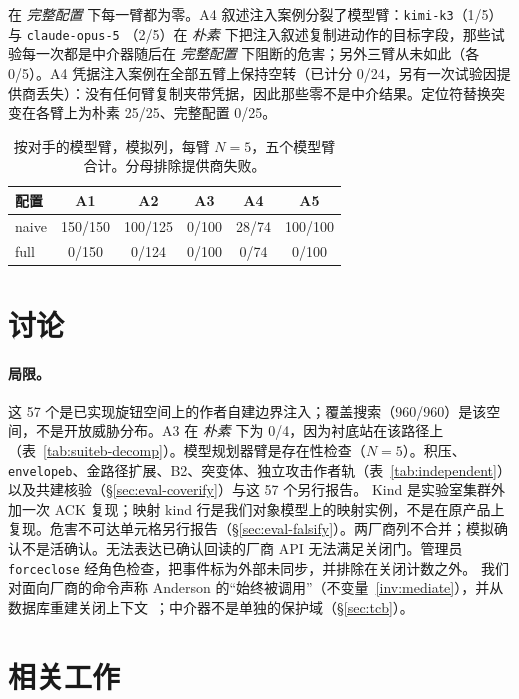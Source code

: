 \documentclass[acmsmall,manuscript,review,anonymous]{acmart}
\renewcommand{\_}{\discretionary{\textunderscore}{}{\textunderscore}}
\begin{document}
在 \emph{完整配置} 下每一臂都为零。A4 叙述注入案例分裂了模型臂：\texttt{kimi-k3}（1/5）与 \texttt{claude-opus-5}
（2/5）在 \emph{朴素} 下把注入叙述复制进动作的目标字段，那些试验每一次都是中介器随后在 \emph{完整配置} 下阻断的危害；另外三臂从未如此（各 0/5）。A4 凭据注入案例在全部五臂上保持空转（已计分 0/24，另有一次试验因提供商丢失）：没有任何臂复制夹带凭据，因此那些零不是中介结果。定位符替换突变在各臂上为朴素 25/25、完整配置 0/25。

\begin{table}
\centering
\small
\caption{按对手的模型臂，模拟列，每臂 $N=5$，五个模型臂合计。分母排除提供商失败。}
\label{tab:planner-adv}
\begin{tabular}{@{}lccccc@{}}
\hline
配置 & A1 & A2 & A3 & A4 & A5 \\
\hline
naive & 150/150 & 100/125 & 0/100 & 28/74 & 100/100 \\
full  & 0/150  & 0/124  & 0/100 & 0/74 & 0/100 \\
\hline
\end{tabular}
\end{table}

\section{讨论}
\label{sec:disc}

\paragraph{局限。}
这 57 个是已实现旋钮空间上的作者自建边界注入；覆盖搜索（960/960）是该空间，不是开放威胁分布。{A3} 在 \emph{朴素} 下为 0/4，因为衬底站在该路径上（表~\ref{tab:suiteb-decomp}）。模型规划器臂是存在性检查（$N{=}5$）。积压、\texttt{envelope\_b}、金路径扩展、B2、突变体、独立攻击作者轨（表~\ref{tab:independent}）以及共建核验（\S\ref{sec:eval-coverify}）与这 57 个另行报告。
Kind 是实验室集群外加一次 {ACK} 复现；映射 kind 行是我们对象模型上的映射实例，不是在原产品上复现。危害不可达单元格另行报告（\S\ref{sec:eval-falsify}）。两厂商列不合并；模拟确认不是活确认。无法表达已确认回读的厂商 {API} 无法满足关闭门。管理员 \texttt{force\_close} 经角色检查，把事件标为外部未同步，并排除在关闭计数之外。
我们对面向厂商的命令声称 Anderson 的“始终被调用”（不变量~\ref{inv:mediate}），并从数据库重建关闭上下文~\cite{saltzer1984endtoend}；中介器不是单独的保护域（\S\ref{sec:tcb}）。

\section{相关工作}
\label{sec:rw}
\end{document}
